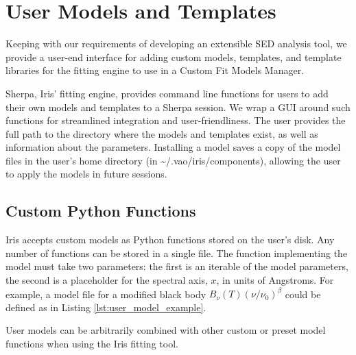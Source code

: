 \documentclass[final,5p]{elsarticle}
\begin{document}

\section{User Models and Templates}
\label{sec:usermodels}

Keeping with our requirements of developing an extensible SED analysis tool, we provide a user-end interface for adding custom models, templates, and template libraries for the fitting engine to use in a Custom Fit Models Manager.

Sherpa, Iris' fitting engine, provides command line functions for users to add their own models and templates to a Sherpa session. We wrap a GUI around such functions for streamlined integration and user-friendliness.
The user provides the full path to the directory where the models and templates exist, as well as information about the parameters. Installing a model saves a copy of the model files in the user's home directory (in \~{}/.vao/iris/components), allowing the user to apply the models in future sessions.


\subsection{Custom Python Functions}
Iris accepts custom models as Python functions stored on the user's disk. Any number of functions can be stored in a single file. The function implementing the model must take two parameters: the first is an iterable of the model parameters, the second is a placeholder for the spectral axis, $x$, in units of Angstroms. For example, a model file for a modified black body
\(B_{\nu}(T) \left(\nu/\nu_{0}\right)^{\beta}\)
could be defined as in Listing \ref{lst:user_model_example}.

User models can be arbitrarily combined with other custom or preset model functions when using the Iris fitting tool.
\end{document}
